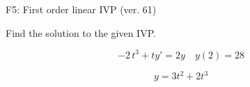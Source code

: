 \begin{exercise}
  \begin{exerciseTitle}F5: First order linear IVP (ver. 61)\end{exerciseTitle}
  \begin{exerciseStatement}
    
Find the solution to the given IVP.

    
\[-2 \, t^{3} +ty'= 2 y \hspace{1em} y( 2 ) = 28\]

  \end{exerciseStatement}
  \begin{exerciseAnswer}
    
\[y= 3 t^ 2 +2 t^{3}\]

  \end{exerciseAnswer}
\end{exercise}